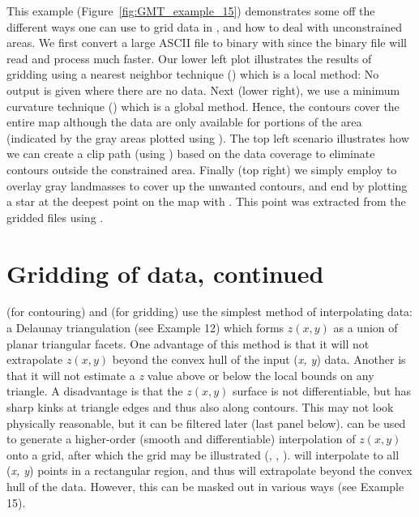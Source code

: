 This example (Figure~\ref{fig:GMT_example_15}) demonstrates
some off the different ways one
can use to grid data in \GMT, and how to deal with unconstrained
areas.  We first convert a large ASCII file to binary with
 since the binary file will read and process
much faster.  Our lower left plot illustrates the results of
gridding using a nearest neighbor technique ()
which is a local method: No output is given where there are no data.
Next (lower right), we use a minimum curvature technique
() which is a global method.  Hence, the contours
cover the entire map although the data are only available for
portions of the area (indicated by the gray areas plotted using
).  The top left scenario illustrates how we can
create a clip path (using ) based on the data coverage
to eliminate contours outside the constrained area.
Finally (top right) we simply employ  to overlay
gray landmasses to cover up the unwanted contours, and end by
plotting a star at the deepest point on the map with .
This point was extracted from the gridded files using .



\section{Gridding of data, continued}

 (for contouring) and 
(for gridding) use the simplest method of interpolating
data:  a Delaunay triangulation (see Example 12) which
forms $z(x, y)$ as a union of planar triangular facets.
One advantage of this method is that it will not extrapolate
$z(x, y)$ beyond the convex hull of the input ({\it x, y})
data.  Another is that it will not estimate a {\it z} value
above or below the local bounds on any triangle.
A disadvantage is that the $z(x, y)$ surface is not
differentiable, but has sharp kinks at triangle edges and
thus also along contours.  This may not look physically
reasonable, but it can be filtered later (last panel below).
 can be used to generate a higher-order
(smooth and differentiable) interpolation of $z(x, y)$ onto
a grid, after which the grid may be illustrated (,
, ).   will interpolate
to all ({\it x, y}) points in a rectangular region, and thus
will extrapolate beyond the convex hull of the data.  However,
this can be masked out in various ways (see Example 15).


